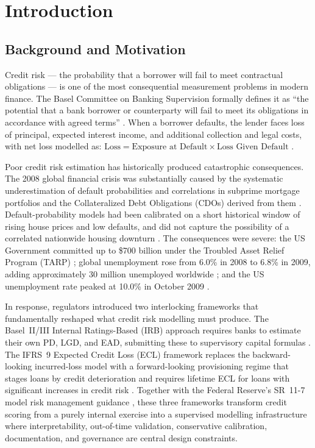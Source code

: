 \documentclass[12pt,a4paper]{report}
\begin{document}
\chapter{Introduction}

\section{Background and Motivation}

Credit risk --- the probability that a borrower will fail to meet contractual obligations --- is one of the most consequential measurement problems in modern finance. The Basel Committee on Banking Supervision formally defines it as ``the potential that a bank borrower or counterparty will fail to meet its obligations in accordance with agreed terms'' \cite{bcbs2000}. When a borrower defaults, the lender faces loss of principal, expected interest income, and additional collection and legal costs, with net loss modelled as: $\text{Loss} = \text{Exposure at Default} \times \text{Loss Given Default}$ \cite{bis_el_ul}.

Poor credit risk estimation has historically produced catastrophic consequences. The 2008 global financial crisis was substantially caused by the systematic underestimation of default probabilities and correlations in subprime mortgage portfolios and the Collateralized Debt Obligations (CDOs) derived from them \cite{baily2008, imf2010}. Default-probability models had been calibrated on a short historical window of rising house prices and low defaults, and did not capture the possibility of a correlated nationwide housing downturn \cite{kirabaeva2011}. The consequences were severe: the US Government committed up to \$700 billion under the Troubled Asset Relief Program (TARP) \cite{tarp_treasury}; global unemployment rose from 6.0\% in 2008 to 6.8\% in 2009, adding approximately 30 million unemployed worldwide \cite{imf_unemployment}; and the US unemployment rate peaked at 10.0\% in October 2009 \cite{bls_recession}.

In response, regulators introduced two interlocking frameworks that fundamentally reshaped what credit risk modelling must produce. The Basel~II/III Internal Ratings-Based (IRB) approach requires banks to estimate their own PD, LGD, and EAD, submitting these to supervisory capital formulas \cite{bcbs2004, bcbs2010}. The IFRS~9 Expected Credit Loss (ECL) framework replaces the backward-looking incurred-loss model with a forward-looking provisioning regime that stages loans by credit deterioration and requires lifetime ECL for loans with significant increases in credit risk \cite{iasb2014}. Together with the Federal Reserve's SR~11-7 model risk management guidance \cite{sr117}, these three frameworks transform credit scoring from a purely internal exercise into a supervised modelling infrastructure where interpretability, out-of-time validation, conservative calibration, documentation, and governance are central design constraints.
\end{document}
